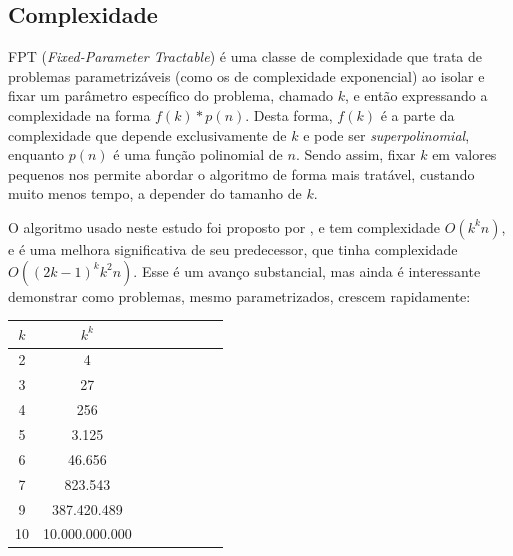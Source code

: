 \subsection{Complexidade}
FPT (\textit{Fixed-Parameter Tractable}) é uma classe de complexidade que trata de problemas parametrizáveis (como os de complexidade exponencial) ao isolar e fixar um parâmetro específico do problema, chamado $k$, e então expressando a complexidade na forma $f(k)*p(n).$ Desta forma, $f(k)$ é a parte da complexidade que depende exclusivamente de $k$ e pode ser \textit{superpolinomial}, enquanto $p(n)$ é uma função polinomial de $n$. Sendo assim, fixar $k$ em valores pequenos nos permite abordar o algoritmo de forma mais tratável, custando muito menos tempo, a depender do tamanho de $k$.

O algoritmo usado neste estudo foi proposto por \cite{Enciso2009}, e tem complexidade $O(k^kn)$, e é uma melhora significativa de seu predecessor, que tinha complexidade $O((2k-1)^kk^2n)$. Esse é um avanço substancial, mas ainda é interessante demonstrar como problemas, mesmo parametrizados, crescem rapidamente:

\begin{table}[h]
\begin{center}
\begin{tabular}{|c|c|c|c|c|c|c|c|}
\hline
$k$ & $k^k$\\
\hline
2 & 4 \\
\hline
3 & 27 \\
\hline
4 & 256 \\
\hline
5 & 3.125 \\
\hline
6 & 46.656 \\
\hline
7 & 823.543 \\
\hline
9 & 387.420.489 \\
\hline
10 & 10.000.000.000 \\
\hline
\end{tabular}
\end{center}
\end{table}

